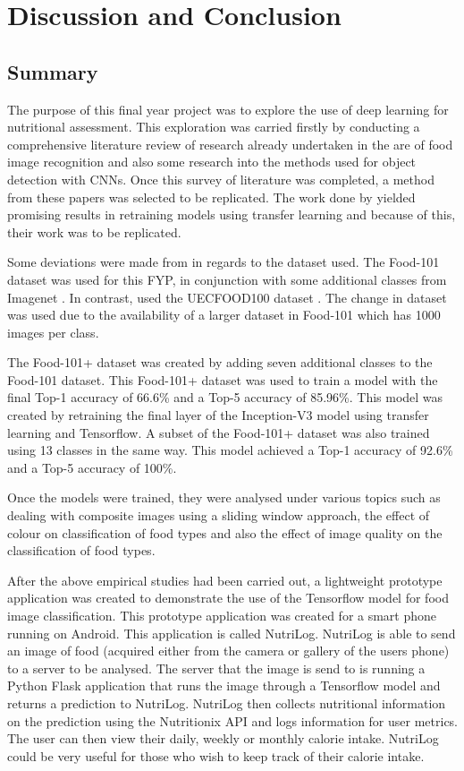 \chapter{Discussion and Conclusion}
\section{Summary}
The purpose of this final year project was to explore the use of deep learning for nutritional assessment.
This exploration was carried firstly by conducting a comprehensive literature review of research already undertaken in the are of food image recognition and also some research into the methods used for object detection with CNNs.
Once this survey of literature was completed, a method from these papers was selected to be replicated.
The work done by \parencite{yanaiFood} yielded promising results in retraining models using transfer learning and because of this, their work was to be replicated.

Some deviations were made from \parencite{yanaiFood} in regards to the dataset used.
The Food-101 dataset was used for this FYP, in conjunction with some additional classes from Imagenet \parencite{imagenet}.
In contrast, \parencite{yanaiFood} used the UECFOOD100 dataset \parencite{uecFood}.
The change in dataset was used due to the availability of a larger dataset in Food-101 which has 1000 images per class.

The Food-101+ dataset was created by adding seven additional classes to the Food-101 dataset.
This Food-101+ dataset was used to train a model with the final Top-1 accuracy of 66.6\% and a Top-5 accuracy of  85.96\%.
This model was created by retraining the final layer of the Inception-V3 \parencite{rethinkingInception} model using transfer learning and Tensorflow.
A subset of the Food-101+ dataset was also trained using 13 classes in the same way.
This model achieved a Top-1 accuracy of 92.6\% and a Top-5 accuracy of 100\%.

Once the models were trained, they were analysed under various topics such as
dealing with composite images using a sliding window approach, the effect of colour on classification of food types and also the effect of image quality on the classification of food types.

After the above empirical studies had been carried out, a lightweight prototype application was created to demonstrate the use of the Tensorflow model for food image classification.
This prototype application was created for a smart phone running on Android.
This application is called NutriLog.
NutriLog is able to send an image of food (acquired either from the camera or gallery of the users phone) to a server to be analysed.
The server that the image is send to is running a Python Flask application that runs the image through a Tensorflow model and returns a prediction to NutriLog.
NutriLog then collects nutritional information on the prediction using the Nutritionix API and logs information for user metrics.
The user can then view their daily, weekly or monthly calorie intake.
NutriLog could be very useful for those who wish to keep track of their calorie intake.

